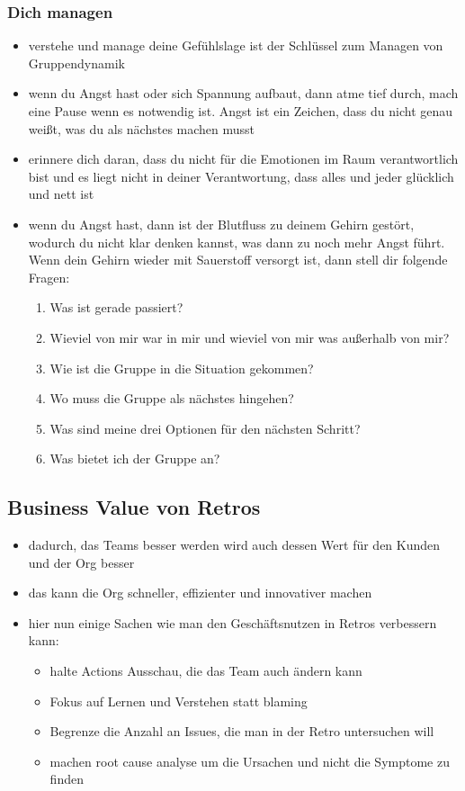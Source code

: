 \subsubsection{Dich managen}
\begin{itemize}
  \item verstehe und manage deine Gefühlslage ist der Schlüssel zum Managen von Gruppendynamik
  \item wenn du Angst hast oder sich Spannung aufbaut, dann atme tief durch, mach eine Pause
    wenn es notwendig ist. Angst ist ein Zeichen, dass du nicht genau weißt, was du als
    nächstes machen musst
  \item erinnere dich daran, dass du nicht für die Emotionen im Raum verantwortlich
    bist und es liegt nicht in deiner Verantwortung, dass alles und jeder glücklich und nett ist
  \item wenn du Angst hast, dann ist der Blutfluss zu deinem Gehirn gestört, wodurch du nicht
    klar denken kannst, was dann zu noch mehr Angst führt. Wenn dein Gehirn wieder mit
    Sauerstoff versorgt ist, dann stell dir folgende Fragen:
    \begin{enumerate}
      \item Was ist gerade passiert?
      \item Wieviel von mir war in mir und wieviel von mir was außerhalb von mir?
      \item Wie ist die Gruppe in die Situation gekommen?
      \item Wo muss die Gruppe als nächstes hingehen?
      \item Was sind meine drei Optionen für den nächsten Schritt?
      \item Was bietet ich der Gruppe an?
    \end{enumerate}
\end{itemize}


\subsection{Business Value von Retros}
\begin{itemize}
  \item dadurch, das Teams besser werden wird auch dessen Wert für den Kunden und der Org
    besser
  \item das kann die Org schneller, effizienter und innovativer machen
  \item hier nun einige Sachen wie man den Geschäftsnutzen in Retros verbessern kann:
    \begin{itemize}
      \item halte Actions Ausschau, die das Team auch ändern kann
      \item Fokus auf Lernen und Verstehen statt blaming
      \item Begrenze die Anzahl an Issues, die man in der Retro untersuchen will
      \item machen root cause analyse um die Ursachen und nicht die Symptome zu finden
    \end{itemize}
\end{itemize}


